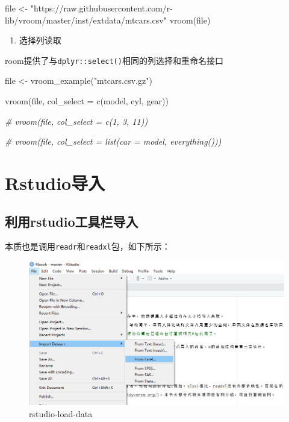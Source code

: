 \documentclass[
]{book}
\newenvironment{Shaded}{\begin{snugshade}}{\end{snugshade}}
\newcommand{\AttributeTok}[1]{\textcolor[rgb]{0.77,0.63,0.00}{#1}}
\newcommand{\CommentTok}[1]{\textcolor[rgb]{0.56,0.35,0.01}{\textit{#1}}}
\newcommand{\FunctionTok}[1]{\textcolor[rgb]{0.00,0.00,0.00}{#1}}
\newcommand{\NormalTok}[1]{#1}
\newcommand{\OtherTok}[1]{\textcolor[rgb]{0.56,0.35,0.01}{#1}}
\newcommand{\StringTok}[1]{\textcolor[rgb]{0.31,0.60,0.02}{#1}}
\providecommand{\tightlist}{%
  \setlength{\itemsep}{0pt}\setlength{\parskip}{0pt}}
\begin{document}
\begin{Shaded}
\begin{Highlighting}[]
\NormalTok{file }\OtherTok{\textless{}{-}} \StringTok{"https://raw.githubusercontent.com/r{-}lib/vroom/master/inst/extdata/mtcars.csv"}
\FunctionTok{vroom}\NormalTok{(file)}
\end{Highlighting}
\end{Shaded}

\begin{enumerate}
\def\labelenumi{\arabic{enumi}.}
\setcounter{enumi}{4}
\tightlist
\item
  选择列读取
\end{enumerate}

room提供了与\texttt{dplyr::select()}相同的列选择和重命名接口

\begin{Shaded}
\begin{Highlighting}[]
\NormalTok{file }\OtherTok{\textless{}{-}} \FunctionTok{vroom\_example}\NormalTok{(}\StringTok{"mtcars.csv.gz"}\NormalTok{)}

\FunctionTok{vroom}\NormalTok{(file, }\AttributeTok{col\_select =} \FunctionTok{c}\NormalTok{(model, cyl, gear))}

\CommentTok{\# vroom(file, col\_select = c(1, 3, 11))}

\CommentTok{\# vroom(file, col\_select = list(car = model, everything()))}
\end{Highlighting}
\end{Shaded}

\hypertarget{data:rstudio-addins}{%
\section{Rstudio导入}\label{data:rstudio-addins}}

\hypertarget{ux5229ux7528rstudioux5de5ux5177ux680fux5bfcux5165}{%
\subsection{利用rstudio工具栏导入}\label{ux5229ux7528rstudioux5de5ux5177ux680fux5bfcux5165}}

本质也是调用\texttt{readr}和\texttt{readxl}包，如下所示：

\begin{figure}
\centering
\includegraphics{picture/read-write/Rstudio-load-data.png}
\caption{rstudio-load-data}
\end{figure}
\end{document}
